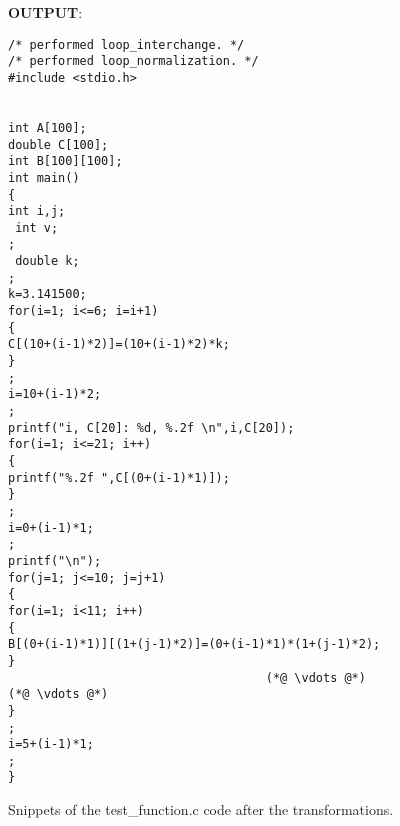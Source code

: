 \documentclass{scrartcl}
\begin{document}
\begin{figure}
\centering
\textbf{OUTPUT}:
\begin{lstlisting}
/* performed loop_interchange. */
/* performed loop_normalization. */
#include <stdio.h>


int A[100];
double C[100];
int B[100][100];
int main()
{
int i,j;
 int v;
;
 double k;
;
k=3.141500;
for(i=1; i<=6; i=i+1)
{
C[(10+(i-1)*2)]=(10+(i-1)*2)*k;
}
;
i=10+(i-1)*2;
;
printf("i, C[20]: %d, %.2f \n",i,C[20]);
for(i=1; i<=21; i++)
{
printf("%.2f ",C[(0+(i-1)*1)]);
}
;
i=0+(i-1)*1;
;
printf("\n");
for(j=1; j<=10; j=j+1)
{
for(i=1; i<11; i++)
{
B[(0+(i-1)*1)][(1+(j-1)*2)]=(0+(i-1)*1)*(1+(j-1)*2);
}
									(*@ \vdots @*)                                 (*@ \vdots @*)
}
;
i=5+(i-1)*1;
;
}
\end{lstlisting}
\caption{Snippets of the test\_function.c code after the transformations.}
\label{code:FULL}
\end{figure}



\end{document}
